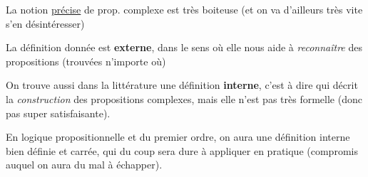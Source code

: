 \begin{frame}

La notion \underline{précise} de prop. complexe est très boiteuse (et on va d'ailleurs très vite s'en désintéresser)\newline \pause

La définition donnée est \textbf{externe}, dans le sens où elle nous aide à \textit{reconnaître} des propositions (trouvées n'importe où)\pause \newline

On trouve aussi dans la littérature une définition \textbf{interne}, c'est à dire qui décrit la \textit{construction} des propositions complexes, mais elle n'est pas très formelle (donc pas super satisfaisante).\newline \pause

En logique propositionnelle et du premier ordre, on aura une définition interne bien définie et carrée, qui du coup sera dure à appliquer en pratique (compromis auquel on aura du mal à échapper).

\end{frame}

